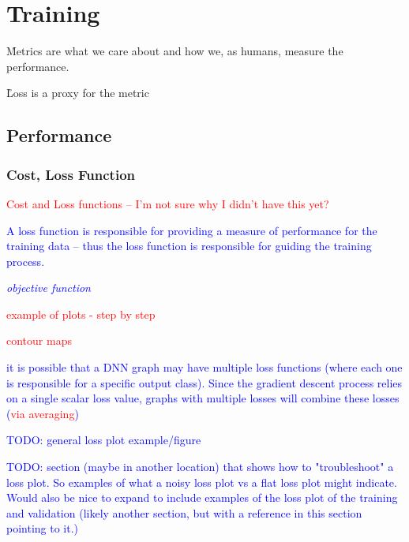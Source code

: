 
\section{Training}


\r{Metrics are what we care about and how we, as humans, measure the performance.}

\r{Loss is a proxy for the metric}


\subsection{Performance}

\subsubsection{Cost, Loss Function}

\textcolor{red}{Cost and Loss functions -- I'm not sure why I didn't have this yet?}

\textcolor{blue}{A loss function is responsible for providing a measure of performance for the training data -- thus the loss function is responsible for guiding the training process.}

\textcolor{blue}{\textit{objective function}}

\textcolor{red}{example of plots - step by step}

\textcolor{red}{contour maps}

\textcolor{blue}{it is possible that a DNN graph may have multiple loss functions (where each one is responsible for a specific output class). Since the gradient descent process relies on a single scalar loss value, graphs with multiple losses will combine these losses (\textcolor{red}{via averaging})}

\textcolor{blue}{TODO: general loss plot example/figure}

\textcolor{blue}{TODO: section (maybe in another location) that shows how to "troubleshoot" a loss plot. So examples of what a noisy loss plot vs a flat loss plot might indicate. Would also be nice to expand to include examples of the loss plot of the training and validation (likely another section, but with a reference in this section pointing to it.)}

